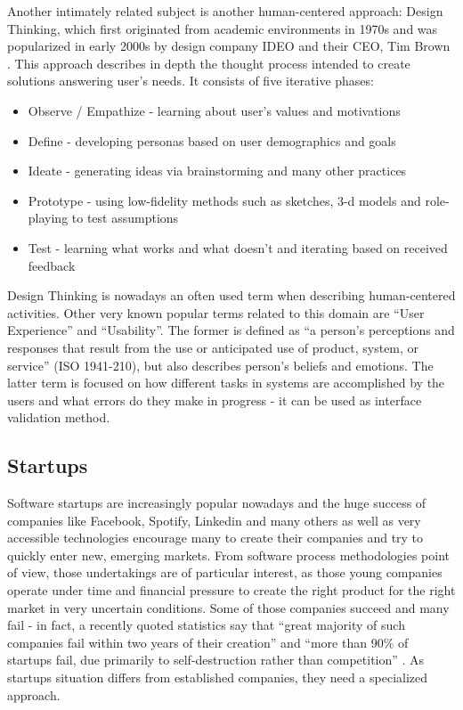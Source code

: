\documentclass{article}
\begin{document}
Another intimately related subject is another human-centered approach: Design Thinking, which first originated from academic environments in 1970s and was popularized in early 2000s by design company IDEO and their CEO, Tim Brown \cite{brown2009change}. This approach describes in depth the thought process intended to create solutions answering user's needs. It consists of five iterative phases:
\begin{itemize}
    \item Observe / Empathize - learning about user's values and motivations
    \item Define - developing personas based on user demographics and goals
    \item Ideate - generating ideas via brainstorming and many other practices
    \item Prototype - using low-fidelity methods such as sketches, 3-d models and role-playing to test assumptions
    \item Test - learning what works and what doesn't and iterating based on received feedback
\end{itemize}
Design Thinking is nowadays an often used term when describing human-centered activities. Other very known popular terms related to this domain are ``User Experience'' and ``Usability''. The former is defined as ``a person's perceptions and responses that result from the use or anticipated use of product, system, or service'' (ISO 1941-210), but also describes person's beliefs and emotions. The latter term is focused on how different tasks in systems are accomplished by the users and what errors do they make in progress - it can be used as interface validation method. 

\subsection{Startups}
Software startups are increasingly popular nowadays and the huge success of companies like Facebook, Spotify, Linkedin and many others as well as very accessible technologies encourage many to create their companies and try to quickly enter new, emerging markets. From software process methodologies point of view, those undertakings are of particular interest, as those young companies operate under time and financial pressure to create the right product for the right market in very uncertain conditions. Some of those companies succeed and many fail - in fact, a recently quoted statistics say that ``great majority of such companies fail within two years of their creation'' \cite{paternoster2014software} and ``more than 90\% of startups fail, due primarily to self-destruction rather than competition'' \cite{giardino2014early}. As startups situation differs from established companies, they need a specialized approach. 
\end{document}
